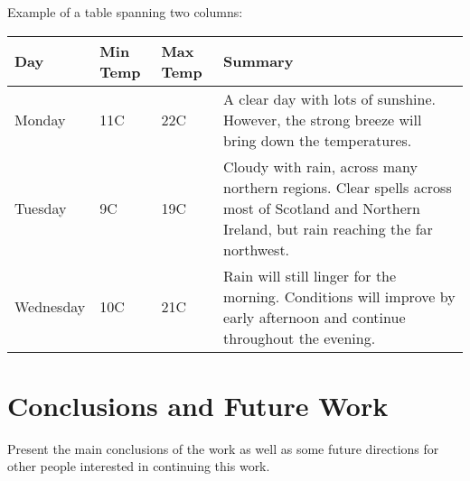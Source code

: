 \documentclass[10pt,twocolumn,letterpaper]{article}
\begin{document}
Example of a table spanning two columns: 

\begin{table*}
\begin{center}
    \begin{tabular}{ | l | l | l | p{8cm} |}
    \hline
    Day & Min Temp & Max Temp & Summary \\ \hline
    Monday & 11C & 22C & A clear day with lots of sunshine.  
    However, the strong breeze will bring down the temperatures. \\ \hline
    Tuesday & 9C & 19C & Cloudy with rain, across many northern regions. Clear spells
    across most of Scotland and Northern Ireland,
    but rain reaching the far northwest. \\ \hline
    Wednesday & 10C & 21C & Rain will still linger for the morning.
    Conditions will improve by early afternoon and continue
    throughout the evening. \\
    \hline
    \end{tabular}
\end{center}    
\end{table*}

\section{Conclusions and Future Work}
Present the main conclusions of the work as well as some future directions for other people interested in continuing this work. 

{\small


}
\end{document}
